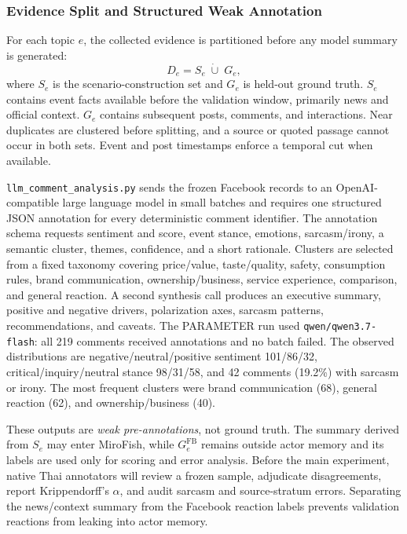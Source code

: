 \documentclass[conference]{IEEEtran}
\begin{document}
\subsubsection{Evidence Split and Structured Weak Annotation}

For each topic $e$, the collected evidence is partitioned before any model
summary is generated:
\begin{equation}
    D_e = S_e \;\dot\cup\; G_e,
\end{equation}
where $S_e$ is the scenario-construction set and $G_e$ is held-out ground
truth. $S_e$ contains event facts available before the validation window,
primarily news and official context. $G_e$ contains subsequent posts, comments,
and interactions. Near duplicates are clustered before splitting, and a source
or quoted passage cannot occur in both sets. Event and post timestamps enforce
a temporal cut when available.

\texttt{llm\_comment\_analysis.py} sends the frozen Facebook records to an
OpenAI-compatible large language model in small batches and requires one
structured JSON annotation for every deterministic comment identifier. The
annotation schema requests sentiment and score, event stance, emotions,
sarcasm/irony, a semantic cluster, themes, confidence, and a short rationale.
Clusters are selected from a fixed taxonomy covering price/value, taste/quality,
safety, consumption rules, brand communication, ownership/business, service
experience, comparison, and general reaction. A second synthesis call produces
an executive summary, positive and negative drivers, polarization axes,
sarcasm patterns, recommendations, and caveats. The PARAMETER run used
\texttt{qwen/qwen3.7-flash}: all 219 comments received annotations and no batch
failed. The observed distributions are negative/neutral/positive sentiment
101/86/32, critical/inquiry/neutral stance 98/31/58, and 42 comments (19.2\%)
with sarcasm or irony. The most frequent clusters were brand communication
(68), general reaction (62), and ownership/business (40).

These outputs are \emph{weak pre-annotations}, not ground truth. The summary
derived from $S_e$ may enter MiroFish, while $G_e^{\mathrm{FB}}$ remains
outside actor memory and its labels are used only for scoring and error
analysis. Before the main experiment, native Thai annotators will review a
frozen sample, adjudicate disagreements, report Krippendorff's $\alpha$, and
audit sarcasm and source-stratum errors. Separating the news/context summary
from the Facebook reaction labels prevents validation reactions from leaking
into actor memory.
\end{document}
